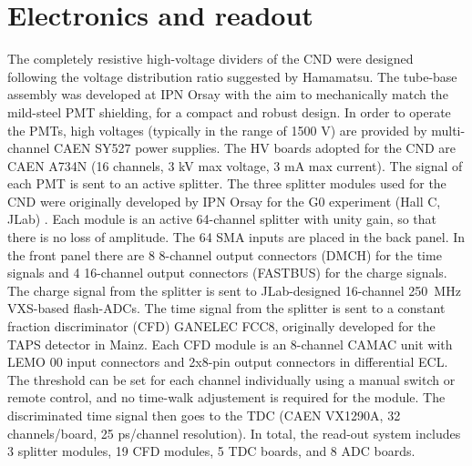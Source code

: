 \section{Electronics and readout}
The completely resistive high-voltage dividers of the CND were designed following the voltage distribution ratio suggested by Hamamatsu. The tube-base assembly was developed at IPN Orsay with the aim to mechanically match the mild-steel PMT shielding, for a compact and robust design. 
In order to operate the PMTs, high voltages (typically in the range of 1500 V) are provided by multi-channel CAEN SY527 power supplies. 
The HV boards adopted for the CND are CAEN A734N (16 channels, 3 kV max voltage, 3 mA max current). %
The signal of each PMT is sent to an active splitter.
The three splitter modules used for the CND were originally developed by IPN Orsay for the G0 experiment (Hall C, JLab) \cite{Androic:2011rha}. Each module is an active 64-channel splitter with unity gain, so that there is no loss of amplitude. The 64 SMA inputs are placed in the back panel. In the front panel there are 8 8-channel output connectors (DMCH) for the time signals and 4 16-channel output connectors (FASTBUS) for the charge signals. 
The charge signal from the splitter is sent to JLab-designed 16-channel 250~MHz VXS-based flash-ADCs.  
The time signal from the splitter is sent to a constant fraction discriminator (CFD) GANELEC FCC8, originally developed for the TAPS detector in Mainz. Each CFD module is an 8-channel CAMAC unit with LEMO 00 input connectors and 2x8-pin output connectors in differential ECL. The threshold can be set for each channel individually using a manual switch or remote control, and no time-walk adjustement is required for the module.  
The discriminated time signal then goes to the TDC (CAEN VX1290A, 32 channels/board, 25 ps/channel resolution). 
In total, the read-out system includes 3 splitter modules, 19 CFD modules, 5 TDC boards, and 8 ADC boards. 



